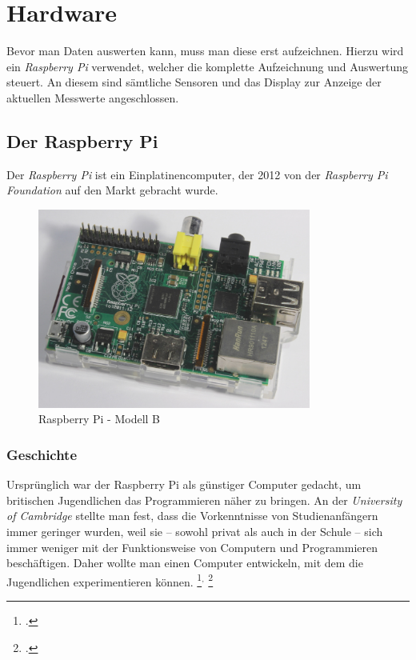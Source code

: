 \chapter{Hardware}
\label{cha:Hardware}

Bevor man Daten auswerten kann, muss man diese erst aufzeichnen. Hierzu wird ein \emph{Raspberry Pi} verwendet, welcher die komplette Aufzeichnung und Auswertung steuert. An diesem sind sämtliche Sensoren und das Display zur Anzeige der aktuellen Messwerte angeschlossen.

\section{Der Raspberry Pi}
\label{sec:Raspberry}
Der \emph{Raspberry Pi} ist ein \gls{Einplatinencomputer}, der 2012 von der \emph{Raspberry Pi Foundation} auf den Markt gebracht wurde.

\begin{figure}[h]
  \centering
     \includegraphics[width=0.8\textwidth]{figures/raspberry.jpg}
 \caption[Raspberry Pi - Modell B]{Raspberry Pi - Modell B}
  \label{fig:raspberry}
\end{figure}

\subsection{Geschichte}
\label{subsec:Geschichte}
Ursprünglich war der Raspberry Pi als günstiger Computer gedacht, um britischen Jugendlichen das Programmieren näher zu bringen. An der \emph{University of Cambridge} stellte man fest, dass die Vorkenntnisse von Studienanfängern immer geringer wurden, weil sie -- sowohl privat als auch in der Schule -- sich immer weniger mit der Funktionsweise von Computern und Programmieren beschäftigen. Daher wollte man einen Computer entwickeln, mit dem die Jugendlichen experimentieren können.
\footcite{aboutraspberry}$^,$
\footcite[Geschichte]{wiki:raspberry}

